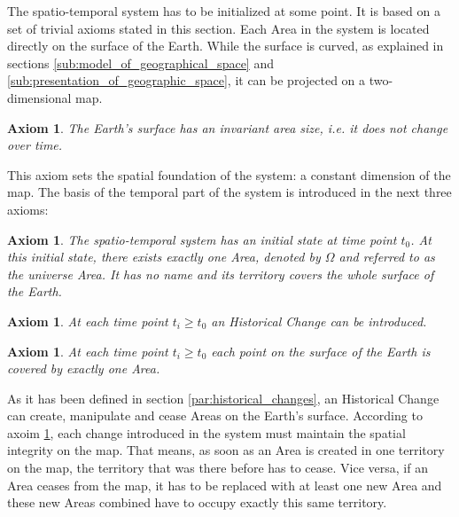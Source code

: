 The spatio-temporal system has to be initialized at some point. It is based on a set of trivial axioms stated in this section. Each Area in the system is located directly on the surface of the Earth. While the surface is curved, as explained in sections \ref{sub:model_of_geographical_space} and \ref{sub:presentation_of_geographic_space}, it can be projected on a two-dimensional map.

\newtheorem{invariant_surface}[assicounter]{Axiom}
\begin{invariant_surface}
\label{axm:invariant_surface}
  The Earth's surface has an invariant area size, i.e. it does not change over time.
\end{invariant_surface}

This axiom sets the spatial foundation of the system: a constant dimension of the map. The basis of the temporal part of the system is introduced in the next three axioms:

\newtheorem{initial_configuration}[assicounter]{Axiom}
\begin{initial_configuration}
\label{axm:initial_configuration}
  The spatio-temporal system has an initial state at time point $t_0$. At this initial state, there exists exactly one Area, denoted by $\Omega$ and referred to as the \emph{universe} Area. It has no name and its territory covers the whole surface of the Earth.
\end{initial_configuration}

\vspace{-1.5em}
\newtheorem{historical_change}[assicounter]{Axiom}
\begin{historical_change}
\label{axm:historical_change}
  At each time point $t_i \geq t_0$ an Historical Change can be introduced.
\end{historical_change}

\vspace{-1.5em}
\newtheorem{unique_coverage}[assicounter]{Axiom}
\begin{unique_coverage}
\label{axm:unique_coverage}
  At each time point $t_i \geq t_0$ each point on the surface of the Earth is covered by exactly one Area.
\end{unique_coverage}

As it has been defined in section \ref{par:historical_changes}, an Historical Change can create, manipulate and cease Areas on the Earth's surface. According to axoim \ref{axm:unique_coverage}, each change introduced in the system must maintain the spatial integrity on the map. That means, as soon as an Area is created in one territory on the map, the territory that was there before has to cease. Vice versa, if an Area ceases from the map, it has to be replaced with at least one new Area and these new Areas combined have to occupy exactly this same territory.

